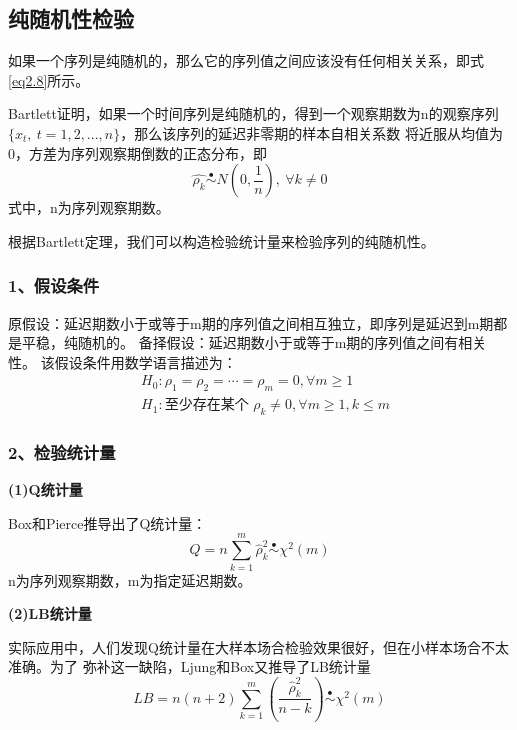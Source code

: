 \documentclass[12pt, a4paper, oneside]{ctexbook}
\begin{document}
\subsection{纯随机性检验}
如果一个序列是纯随机的，那么它的序列值之间应该没有任何相关关系，即式\ref{eq2.8}所示。

Bartlett证明，如果一个时间序列是纯随机的，得到一个观察期数为n的观察序列$\{x_t,~t = 1,2,...,n\}$，那么该序列的延迟非零期的样本自相关系数
将近服从均值为0，方差为序列观察期倒数的正态分布，即
\begin{equation}
    \hat{\rho_k} \overset{\bullet}{\operatorname*{\sim}} N(0,\frac{1}{n}),~\forall k \neq 0
\end{equation}
式中，n为序列观察期数。

根据Bartlett定理，我们可以构造检验统计量来检验序列的纯随机性。

\subsubsection{1、假设条件}
原假设：延迟期数小于或等于m期的序列值之间相互独立，即序列是延迟到m期都是平稳，纯随机的。
备择假设：延迟期数小于或等于m期的序列值之间有相关性。
该假设条件用数学语言描述为：
\begin{equation}
    \begin{aligned}
         & H_0:\rho_1=\rho_2=\cdots=\rho_m=0,\forall m\geqslant1                \\
         & H_1:\text{至少存在某个 }\rho_k\neq0,\forall m\geqslant1,k\leqslant m
    \end{aligned}
\end{equation}

\subsubsection{2、检验统计量}

\textbf{(1)Q统计量}

Box和Pierce推导出了Q统计量：
\begin{equation}
    Q=n\sum_{k\operatorname{=}1}^m\hat{\rho}_k^2\overset{\bullet}{\operatorname*{\sim}}\chi^2(m)
\end{equation}
n为序列观察期数，m为指定延迟期数。

\textbf{(2)LB统计量}

实际应用中，人们发现Q统计量在大样本场合检验效果很好，但在小样本场合不太准确。为了
弥补这一缺陷，Ljung和Box又推导了LB统计量
\begin{equation}
    LB=n(n+2)\sum_{k=1}^m\left(\frac{\hat{\rho}_k^2}{n-k}\right)
    \overset{\bullet}{\operatorname*{\sim}} \chi^2(m)
\end{equation}
\end{document}
